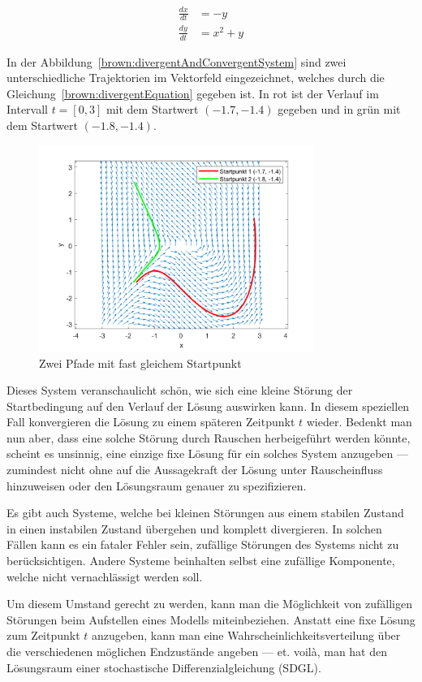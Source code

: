 \begin{align}
	\frac{dx}{dt} &= -y \\
	\frac{dy}{dt} &= x^2 + y
	\label{brown:divergentEquation}
\end{align}

In der Abbildung~\ref{brown:divergentAndConvergentSystem} sind zwei unterschiedliche Trajektorien im Vektorfeld eingezeichnet, welches durch die Gleichung~\ref{brown:divergentEquation} gegeben ist. In rot ist der Verlauf im Intervall  $ t = [0, 3] $ mit dem Startwert $ (-1.7, -1.4) $ gegeben und in grün mit dem Startwert $ (-1.8, -1.4) $.

\begin{figure}
	\centering
	\includegraphics[width=0.8\textwidth]{papers/brown/images/Vektorfeld-mit-zwei-Pfaden.png}
	\caption{Zwei Pfade mit fast gleichem Startpunkt}
	\label{divergentAndConvergentSystem}
\end{figure}

Dieses System veranschaulicht schön, wie sich eine kleine Störung der Startbedingung auf den Verlauf der Lösung auswirken kann. In diesem speziellen Fall konvergieren die Lösung zu einem späteren Zeitpunkt $ t $ wieder. Bedenkt man nun aber, dass eine solche Störung durch Rauschen herbeigeführt werden könnte, scheint es unsinnig, eine einzige fixe Lösung für ein solches System anzugeben --- zumindest nicht ohne auf die Aussagekraft der Lösung unter Rauscheinfluss hinzuweisen oder den Lösungsraum genauer zu spezifizieren.

Es gibt auch Systeme, welche bei kleinen Störungen aus einem stabilen Zustand in einen instabilen Zustand übergehen und komplett divergieren. In solchen Fällen kann es ein fataler Fehler sein, zufällige Störungen des Systems nicht zu berücksichtigen. Andere Systeme beinhalten selbst eine zufällige Komponente, welche nicht vernachlässigt werden soll.

Um diesem Umstand gerecht zu werden, kann man die Möglichkeit von zufälligen Störungen beim Aufstellen eines Modells miteinbeziehen. Anstatt eine fixe Lösung zum Zeitpunkt $ t $ anzugeben, kann man eine Wahrscheinlichkeitsverteilung über die verschiedenen möglichen Endzustände angeben --- et. voilà, man hat den Lösungsraum einer stochastische Differenzialgleichung (SDGL).
